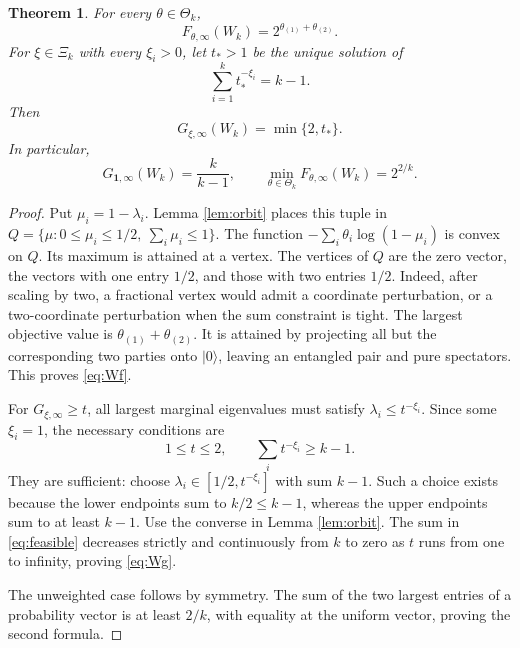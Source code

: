 \documentclass[11pt,a4paper]{article}
\newtheorem{theorem}{Theorem}
\newcommand{\one}{\mathbf 1}
\newcommand{\ket}[1]{|#1\rangle}
\begin{document}
\begin{theorem}\label{thm:W}
For every \(\theta\in\Theta_k\),
\begin{equation}
 F_{\theta,\infty}(W_k)=2^{\theta_{(1)}+\theta_{(2)}}.
 \label{eq:Wf}
\end{equation}
For \(\xi\in\Xi_k\) with every \(\xi_i>0\), let \(t_*>1\) be the
unique solution of
\[
 \sum_{i=1}^kt_*^{-\xi_i}=k-1.
\]
Then
\begin{equation}
 G_{\xi,\infty}(W_k)=\min\{2,t_*\}.
 \label{eq:Wg}
\end{equation}
In particular,
\begin{equation}
 G_{\one,\infty}(W_k)=\frac{k}{k-1},\qquad
 \min_{\theta\in\Theta_k}F_{\theta,\infty}(W_k)=2^{2/k}.
 \label{eq:unweighted}
\end{equation}
\end{theorem}
\begin{proof}
Put \(\mu_i=1-\lambda_i\). Lemma \ref{lem:orbit} places this tuple
in \(Q=\{\mu:0\le\mu_i\le1/2,\ \sum_i\mu_i\le1\}\).
The function \(-\sum_i\theta_i\log(1-\mu_i)\) is convex on \(Q\).
Its maximum is attained at a vertex. The vertices of \(Q\) are
the zero vector, the vectors with one entry \(1/2\), and those with
two entries \(1/2\). Indeed, after scaling by two, a fractional
vertex would admit a coordinate perturbation, or a two-coordinate
perturbation when the sum constraint is tight.
The largest objective value is \(\theta_{(1)}+\theta_{(2)}\).
It is attained by projecting all but the corresponding two parties
onto \(\ket0\), leaving an entangled pair and pure spectators.
This proves \eqref{eq:Wf}.

For \(G_{\xi,\infty}\ge t\), all largest marginal eigenvalues must
satisfy \(\lambda_i\le t^{-\xi_i}\). Since some \(\xi_i=1\),
the necessary conditions are
\begin{equation}
 1\le t\le2,\qquad \sum_it^{-\xi_i}\ge k-1.
 \label{eq:feasible}
\end{equation}
They are sufficient: choose
\(\lambda_i\in[1/2,t^{-\xi_i}]\) with sum \(k-1\).
Such a choice exists because the lower endpoints sum to \(k/2\le k-1\),
whereas the upper endpoints sum to at least \(k-1\).
Use the converse in Lemma \ref{lem:orbit}. The sum in
\eqref{eq:feasible} decreases strictly and continuously from \(k\)
to zero as \(t\) runs from one to infinity, proving \eqref{eq:Wg}.

The unweighted case follows by symmetry. The sum of the two largest
entries of a probability vector is at least \(2/k\), with equality
at the uniform vector, proving the second formula.
\end{proof}
\end{document}
